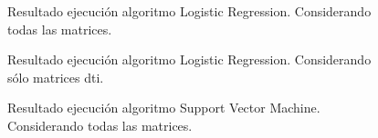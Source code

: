 \begin{figure}[H]
\centering
{}
\caption{Resultado ejecución algoritmo Logistic Regression. Considerando todas las matrices.}
\label{figure:logall}
\end{figure}

\begin{figure}[H]
\centering
{}
\caption{Resultado ejecución algoritmo Logistic Regression. Considerando sólo matrices \gls{dti}.}
\label{figure:logdti}
\end{figure}

\begin{figure}[H]
\centering
{}
\caption{Resultado ejecución algoritmo Support Vector Machine. Considerando todas las matrices.}
\label{figure:svmall}
\end{figure}


